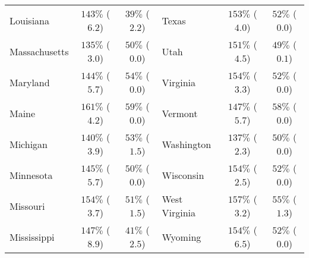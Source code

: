 \begin{tabular}{lcclcc}
Louisiana & $143\%$ ($6.2$)  & $39\%$ ($2.2$)  & Texas & $153\%$ ($4.0$)  & $52\%$ ($0.0$)  \\ 
Massachusetts & $135\%$ ($3.0$)  & $50\%$ ($0.0$)  & Utah & $151\%$ ($4.5$)  & $49\%$ ($0.1$)  \\ 
Maryland & $144\%$ ($5.7$)  & $54\%$ ($0.0$)  & Virginia & $154\%$ ($3.3$)  & $52\%$ ($0.0$)  \\ 
Maine & $161\%$ ($4.2$)  & $59\%$ ($0.0$)  & Vermont & $147\%$ ($5.7$)  & $58\%$ ($0.0$)  \\ 
Michigan & $140\%$ ($3.9$)  & $53\%$ ($1.5$)  & Washington & $137\%$ ($2.3$)  & $50\%$ ($0.0$)  \\ 
Minnesota & $145\%$ ($5.7$)  & $50\%$ ($0.0$)  & Wisconsin & $154\%$ ($2.5$)  & $52\%$ ($0.0$)  \\ 
Missouri & $154\%$ ($3.7$)  & $51\%$ ($1.5$)  & West Virginia & $157\%$ ($3.2$)  & $55\%$ ($1.3$)  \\ 
Mississippi & $147\%$ ($8.9$)  & $41\%$ ($2.5$)  & Wyoming & $154\%$ ($6.5$)  & $52\%$ ($0.0$)  \\ 
\bottomrule
\end{tabular}

